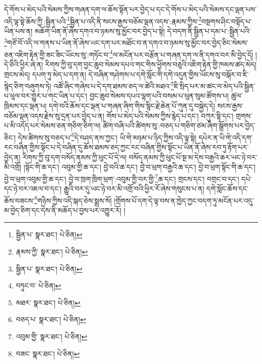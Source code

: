 དེ་གོས་པ་མེད་པའི་སེམས་ཀྱིས་གཞན་དག་ལ་ཆོས་སྟོན་པར་བྱེད་པ་དང་དེ་གོས་པ་མེད་པའི་སེམས་དང་ལྡན་པས་འདི་ལྟ་སྟེ་ཆོས་ཀྱི་:སྦྱིན་པའི་\footnote{སྦྱིན་པ་  སྣར་ཐང་།  པེ་ཅིན། }སྦྱིན་པ་འདི་ནི་སངས་རྒྱས་བཅོམ་ལྡན་འདས་:རྣམས་ཀྱིས་\footnote{རྣམས་ཀྱི་  སྣར་ཐང་།  པེ་ཅིན། }བསྔགས་ཤིང་བསྟོད་པ་ཡིན་པས་ན། མཆོག་ཡིན་ནོ་ཞེས་དགའ་བ་ཉམས་སུ་མྱོང་བར་བྱེད་པ་སྟེ། དེ་བདག་ནི་སྦྱིན་པ་དམ་པ་:སྦྱིན་པའི་\footnote{སྦྱིན་པ་  སྣར་ཐང་།  པེ་ཅིན། }གཙོ་བོ་འདི་ལ་གནས་པ་ཡིན་ནོ་ཞེས་ཡང་དག་པར་མཐོང་བ་ན་དགའ་བ་ཉམས་སུ་མྱོང་བར་བྱེད་ཅིང་སེམས་ཅན་འཇིག་རྟེན་གྱི་ཟང་ཟིང་ཡོངས་སུ་:གཏོང་བ་\footnote{བཏུང་བ་  པེ་ཅིན། }ལ་མངོན་པར་བརྩོན་པ་གཞན་དག་ལ་ནི་དགའ་བར་མི་བྱེད་དོ། །དེ་ཅིའི་ཕྱིར་ཞེ་ན། རིགས་ཀྱི་བུ་དག་བྱང་ཆུབ་སེམས་དཔའ་གང་གིས་ཕྱོགས་བཅུའི་འཇིག་རྟེན་གྱི་ཁམས་ཚད་མེད། གྲངས་མེད། དཔག་ཏུ་མེད་པ་དག་ན། དེ་བཞིན་གཤེགས་པ་དགེ་སློང་གི་དགེ་འདུན་གྱིས་ཡོངས་སུ་བསྐོར་བ་ཇི་སྙེད་ཅིག་བཞུགས་ཏེ། འཚོ་ཞིང་གཞེས་པ་དེ་དག་ཐམས་ཅད་ལ་ཚེའི་མཐའ་\footnote{མཐར་  སྣར་ཐང་།  པེ་ཅིན། }ཇི་སྲིད་པར་མ་ཚང་བ་མེད་པའི་སྦྱིན་པ་ཕུལ་བར་གྱུར་པ་གང་ཡིན་པ་དང་། བྱང་ཆུབ་སེམས་དཔའ་ལྷག་པའི་བསམ་པ་ཕུན་སུམ་ཚོགས་པ། ཚུལ་ཁྲིམས་དང་ལྡན་པ། དགེ་བའི་ཆོས་དང་ལྡན་པ་གཞན་ཞིག་གིས་སྙིང་རྗེ་ཆེན་པོ་ཀུན་དུ་བསྐྱེད་དེ། སངས་རྒྱས་བཅོམ་ལྡན་འདས་རྗེས་སུ་དྲན་པར་བྱེད་པ་ན། གོས་པ་མེད་པའི་སེམས་ཀྱིས་རྙེད་པ་དང་། བཀུར་སྟི་དང་། གྲགས་པ་མི་འདོད་པར་སེམས་ཅན་གཅིག་ཅིག་ལ། ཚིག་བཞི་པའི་ཚིགས་སུ་:བཅད་པ་གཅིག་ཙམ་ཞིག་སྒྲོགས་པར་བྱེད་ཅིང་། དེས་ཚིགས་སུ་བཅད་པ་\footnote{བཅད་པ་  སྣར་ཐང་།  པེ་ཅིན། }དེ་བཤད་ནས་ཀྱང་། ཡི་གེ་མཉམ་པ་ཉིད་ཀྱིས་འདི་ལྟ་སྟེ། དཔེར་ན་ཡི་གེ་འདི་དག་རང་བཞིན་གྱིས་སྟོང་པ་དེ་བཞིན་དུ་ཆོས་ཐམས་ཅད་ཀྱང་རང་བཞིན་གྱིས་སྟོང་པ་ཡིན་ནོ་ཞེས་རབ་ཏུ་རྟོག་པར་བྱེད་ན། རིགས་ཀྱི་བུ་དག་བསོད་ནམས་ཀྱི་ཕུང་པོ་དེ་ལ། བསོད་ནམས་ཀྱི་ཕུང་པོ་སྔ་མ་དེས་བརྒྱའི་ཆར་ཡང་ཉེ་བར་མི་འགྲོ། །སྟོང་གི་ཆ་དང་། འབུམ་གྱི་ཆ་དང་། བྱེ་བའི་ཆ་དང་། བྱེ་བ་ཕྲག་བརྒྱའི་ཆ་དང་། བྱེ་བ་ཕྲག་སྟོང་གི་ཆ་དང་། བྱེ་བ་ཕྲག་འབུམ་གྱི་ཆ་དང་། བྱེ་བ་ཁྲག་ཁྲིག་ཕྲག་:འབུམ་གྱི་བར་གྱི་\footnote{འབུམ་གྱི་  སྣར་ཐང་།  པེ་ཅིན། }ཆ་དང་། གྲངས་དང་། བགྲང་བ་དང་། དཔེ་དང་ཉེ་བར་འཇལ་བ་དང་། རྒྱུའི་བར་དུ་ཡང་ཉེ་བར་མི་འགྲོ་བའི་ཕྱིར་རོ་ཞེས་གསུངས་པ་ན། དགེ་སློང་ཆོས་དང་ཆོས་བཟངས་\footnote{བཟང་  སྣར་ཐང་།  པེ་ཅིན། }གཉིས་ཀྱིས་འདི་སྐད་ཅེས་སྨྲས་སོ། །གྲོགས་པོ་དག་དེ་ལྟ་བས་ན་ཁྱེད་ཀྱང་བདག་ཏུ་མངོན་པར་འདུ་མ་བྱེད་ཅིག་དང་དེས་ནི་མཆོད་པ་བྱས་པར་འགྱུར་རོ། །
